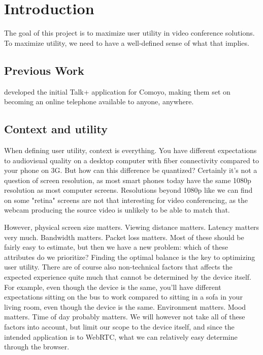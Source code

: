 \chapter{Introduction}\label{chp:introduction}


The goal of this project is to maximize user utility in video conference solutions. To maximize utility, we need to have a well-defined sense of what that implies.

\section{Previous Work}

\cite{bruun} developed the initial Talk+ application for Comoyo, making them set on becoming an online telephone available to anyone, anywhere.

\section{Context and utility}

When defining user utility, context is everything. You have different expectations to audiovisual quality on a desktop computer with fiber connectivity compared to your phone on 3G. But how can this difference be quantized? Certainly it's not a question of screen resolution, as most smart phones today have the same 1080p resolution as most computer screens. Resolutions beyond 1080p like we can find on some "retina" screens are not that interesting for video conferencing, as the webcam producing the source video is unlikely to be able to match that.

However, physical screen size matters. Viewing distance matters. Latency matters very much. Bandwidth matters. Packet loss matters. Most of these should be fairly easy to estimate, but then we have a new problem: which of these attributes do we prioritize? Finding the optimal balance is the key to optimizing user utility. There are of course also non-technical factors that affects the expected experience quite much that cannot be determined by the device itself. For example, even though the device is the same, you'll have different expectations sitting on the bus to work compared to sitting in a sofa in your living room, even though the device is the same. Environment matters. Mood matters. Time of day probably matters. We will however not take all of these factors into account, but limit our scope to the device itself, and since the intended application is to WebRTC, what we can relatively easy determine through the browser.

